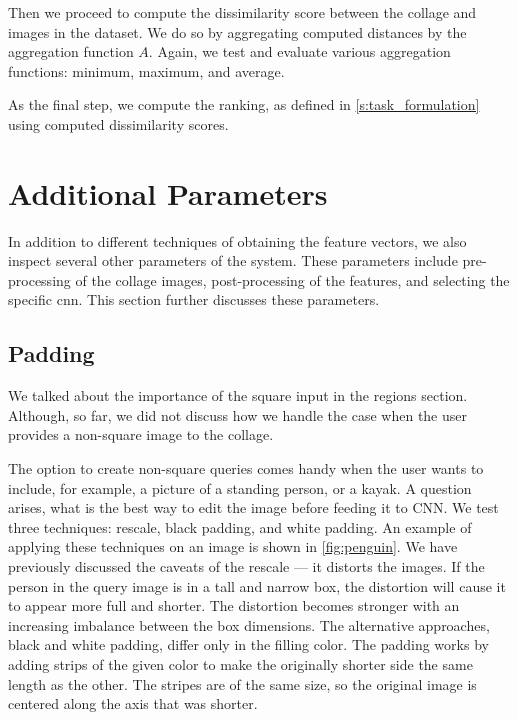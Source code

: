 Then we proceed to compute the dissimilarity score between the collage and images in the dataset. We do so by aggregating computed distances by the aggregation function $A$. Again, we test and evaluate various aggregation functions: minimum, maximum, and average.

As the final step, we compute the ranking, as defined in \autoref{s:task_formulation} using computed dissimilarity scores.

\section{Additional Parameters}

In addition to different techniques of obtaining the feature vectors, we also inspect several other parameters of the system. These parameters include pre-processing of the collage images, post-processing of the features, and selecting the specific \acrshort{cnn}. This section further discusses these parameters.

\subsection{Padding}

We talked about the importance of the square input in the regions section. Although, so far, we did not discuss how we handle the case when the user provides a non-square image to the collage.

The option to create non-square queries comes handy when the user wants to include, for example, a picture of a standing person, or a kayak. A question arises, what is the best way to edit the image before feeding it to CNN. We test three techniques: rescale, black padding, and white padding. An example of applying these techniques on an image is shown in \autoref{fig:penguin}. We have previously discussed the caveats of the rescale --- it distorts the images. If the person in the query image is in a tall and narrow box, the distortion will cause it to appear more full and shorter. The distortion becomes stronger with an increasing imbalance between the box dimensions. The alternative approaches, black and white padding, differ only in the filling color. The padding works by adding strips of the given color to make the originally shorter side the same length as the other. The stripes are of the same size, so the original image is centered along the axis that was shorter. 

